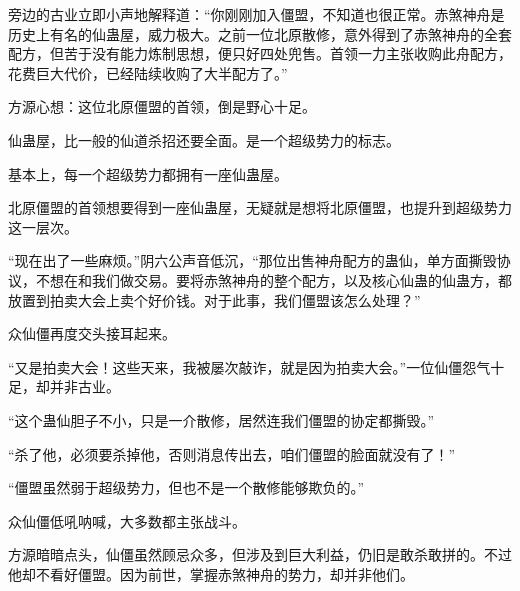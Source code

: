 \begin{this_body}
旁边的古业立即小声地解释道：“你刚刚加入僵盟，不知道也很正常。赤煞神舟是历史上有名的仙蛊屋，威力极大。之前一位北原散修，意外得到了赤煞神舟的全套配方，但苦于没有能力炼制思想，便只好四处兜售。首领一力主张收购此舟配方，花费巨大代价，已经陆续收购了大半配方了。”

方源心想：这位北原僵盟的首领，倒是野心十足。

仙蛊屋，比一般的仙道杀招还要全面。是一个超级势力的标志。

基本上，每一个超级势力都拥有一座仙蛊屋。

北原僵盟的首领想要得到一座仙蛊屋，无疑就是想将北原僵盟，也提升到超级势力这一层次。

“现在出了一些麻烦。”阴六公声音低沉，“那位出售神舟配方的蛊仙，单方面撕毁协议，不想在和我们做交易。要将赤煞神舟的整个配方，以及核心仙蛊的仙蛊方，都放置到拍卖大会上卖个好价钱。对于此事，我们僵盟该怎么处理？”

众仙僵再度交头接耳起来。

“又是拍卖大会！这些天来，我被屡次敲诈，就是因为拍卖大会。”一位仙僵怨气十足，却并非古业。

“这个蛊仙胆子不小，只是一介散修，居然连我们僵盟的协定都撕毁。”

“杀了他，必须要杀掉他，否则消息传出去，咱们僵盟的脸面就没有了！”

“僵盟虽然弱于超级势力，但也不是一个散修能够欺负的。”

众仙僵低吼呐喊，大多数都主张战斗。

方源暗暗点头，仙僵虽然顾忌众多，但涉及到巨大利益，仍旧是敢杀敢拼的。不过他却不看好僵盟。因为前世，掌握赤煞神舟的势力，却并非他们。

\end{this_body}

